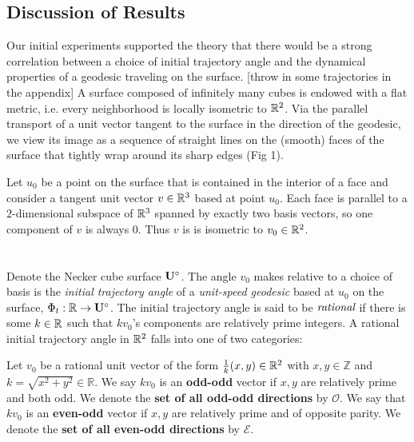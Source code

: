 \documentclass[]{article}
\begin{document}
\subsection{Discussion of Results}
Our initial experiments supported the theory that there would be a strong correlation between a choice of initial trajectory angle and the dynamical properties of a geodesic traveling on the surface. [throw in some trajectories in the appendix] A surface composed of infinitely many cubes is endowed with a flat metric, i.e. every neighborhood is locally isometric to $\mathbb{R}^2$. Via the parallel transport of a unit vector tangent to the surface in the direction of the geodesic, we view its image as a sequence of straight lines on the (smooth) faces of the surface that tightly wrap around its sharp edges (Fig 1).
\\
\begin{figure}

\end{figure}
\noindent Let $u_0$ be a point on the surface that is contained in the interior of a face and consider a tangent unit vector $v\in\mathbb{R}^3$ based at point $u_0$. Each face is parallel to a $2$-dimensional subspace of $\mathbb{R}^3$ spanned by exactly two basis vectors, so one component of $v$ is always 0. Thus $v$ is is isometric to $v_0\in\mathbb{R}^2$.
\\\\\\
Denote the Necker cube surface $\mathbf{U}^\circ$. The angle $v_0$ makes relative to a choice of basis is the \emph{initial trajectory angle} of a \emph{unit-speed geodesic} based at $u_0$ on the surface, $\Phi_t:\mathbb{R}\rightarrow\mathbf{U}^\circ$. The initial trajectory angle is said to be $\emph{rational}$ if there is some $k\in\mathbb{R}$ such that $kv_0$'s components are relatively prime integers. A rational initial trajectory angle in $\mathbb{R}^2$ falls into one of two categories:
\begin{Def}
Let $v_0$ be a rational unit vector of the form $\frac{1}{k}(x,y)\in\mathbb{R}^2$ with $x,y\in\mathbb{Z}$ and $k=\sqrt{x^2+y^2}\in\mathbb{R}$. We say $kv_0$ is an \textbf{odd-odd} vector if $x,y$ are relatively prime and both odd. We denote the \textbf{set of all odd-odd directions} by $\mathcal{O}$. We say that $kv_0$ is an \textbf{even-odd} vector if $x,y$ are relatively prime and of opposite parity. We denote the \textbf{set of all even-odd directions} by $\mathcal{E}$.
\end{Def}
\end{document}
